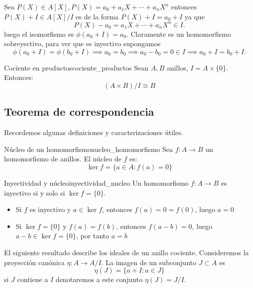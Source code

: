 \begin{proofbox}
    Sea $P(X) \in A[X], P(X) = a_0 + a_1 X + \cdots + a_n X^n$ entonces $P(X) + I \in A[X]/I$ es de la forma $P(X) + I = a_0 + I$ ya que
    \[
    P(X) - a_0 = a_1 X + \cdots + a_n X^n \in I.
    \]
    luego el isomorfismo es $\phi(a_0 + I) = a_0$. Claramente es un homomorfismo sobreyectivo, para ver que es inyectivo supongamos
    \[
    \phi(a_0 + I) = \phi(b_0 + I) \implies a_0 = b_0 \implies a_0 - b_0 = 0 \in I \implies a_0 + I = b_0 + I.
    \]
\end{proofbox}

\begin{example}{Cociente en productos}{cociente_productos}
    Sean \(A, B\) anillos, \(I = A \times \{0\}\). Entonces:
    \[
    (A \times B)/I \cong B
    \]
\end{example}

\subsection{Teorema de correspondencia}

Recordemos algunas definiciones y caracterizaciones útiles.

\begin{definition}{Núcleo de un homomorfismo}{nucleo_homomorfismo}
    Sea \(f: A \to B\) un homomorfismo de anillos. El {núcleo} de \(f\) es:
    \[
    \ker f = \{a \in A : f(a) = 0\}
    \]
\end{definition}

\begin{proposition}{Inyectividad y núcleo}{inyectividad_nucleo}
    Un homomorfismo \(f: A \to B\) es inyectivo si y solo si \(\ker f = \{0\}\).
\end{proposition}

\begin{proofbox}
    \begin{itemize}
        \item Si \(f\) es inyectivo y \(a \in \ker f\), entonces \(f(a) = 0 = f(0)\), luego \(a = 0\)
        \item Si \(\ker f = \{0\}\) y \(f(a) = f(b)\), entonces \(f(a - b) = 0\), luego \(a - b \in \ker f = \{0\}\), por tanto \(a = b\)
    \end{itemize}
\end{proofbox}

El siguiente resultado describe los ideales de un anillo cociente. Consideremos la proyección canónica $\eta : A \to A / I$. La imagen de un subconjunto $J \subset A$ es 
\[
\eta(J) = \{a + I : a \in J\}
\]
si $J$ contiene a $I$ denotaremos a este conjunto $\eta(J) = J/I$.

